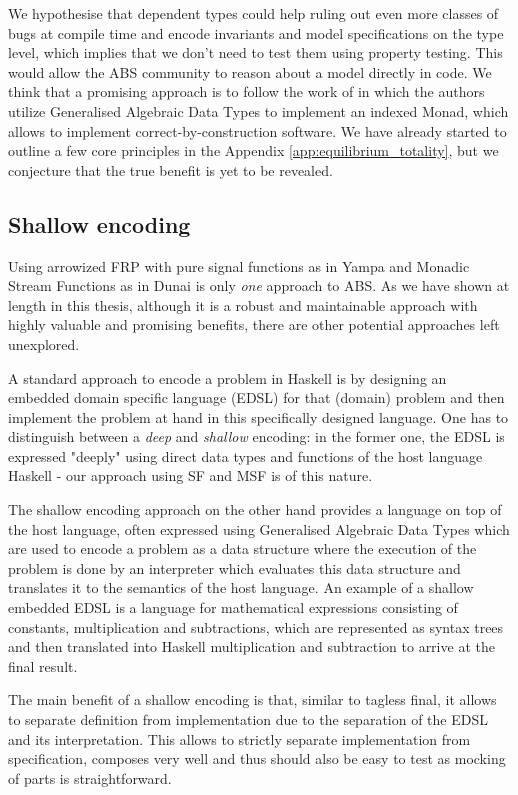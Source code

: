 We hypothesise that dependent types could help ruling out even more classes of bugs at compile time and encode invariants and model specifications on the type level, which implies that we don't need to test them using property testing. This would allow the ABS community to reason about a model directly in code. We think that a promising approach is to follow the work of \cite{brady_programming_2013, brady_state_2016, fowler_dependent_2014} in which the authors utilize Generalised Algebraic Data Types to implement an indexed Monad, which allows to implement correct-by-construction software. We have already started to outline a few core principles in the Appendix \ref{app:equilibrium_totality}, but we conjecture that the true benefit is yet to be revealed.

\subsection{Shallow encoding}
Using arrowized FRP with pure signal functions as in Yampa and Monadic Stream Functions as in Dunai is only \textit{one} approach to ABS. As we have shown at length in this thesis, although it is a robust and maintainable approach with highly valuable and promising benefits, there are other potential approaches left unexplored.

A standard approach to encode a problem in Haskell is by designing an embedded domain specific language (EDSL) for that (domain) problem and then implement the problem at hand in this specifically designed language. One has to distinguish between a \textit{deep} and \textit{shallow} encoding: in the former one, the EDSL is expressed "deeply" using direct data types and functions of the host language Haskell - our approach using SF and MSF is of this nature.

The shallow encoding approach on the other hand provides a language on top of the host language, often expressed using Generalised Algebraic Data Types which are used to encode a problem as a data structure where the execution of the problem is done by an interpreter which evaluates this data structure and translates it to the semantics of the host language. An example of a shallow embedded EDSL is a language for mathematical expressions consisting of constants, multiplication and subtractions, which are represented as syntax trees and then translated into Haskell multiplication and subtraction to arrive at the final result.

The main benefit of a shallow encoding is that, similar to tagless final, it allows to separate definition from implementation due to the separation of the EDSL and its interpretation. This allows to strictly separate implementation from specification, composes very well and thus should also be easy to test as mocking of parts is straightforward.

